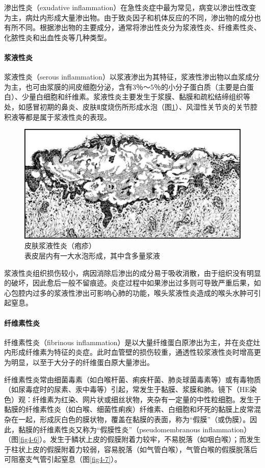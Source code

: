 渗出性炎（exudative
inflammation）在急性炎症中最为常见，病变以渗出性改变为主，病灶内形成大量渗出物。由于致炎因子和机体反应的不同，渗出物的成分也有所不同。根据渗出物的主要成分，通常将渗出性炎分为浆液性炎、纤维素性炎、化脓性炎和出血性炎等几种类型。

\paragraph{浆液性炎}
浆液性炎（serous
inflammation）以浆液渗出为其特征，浆液性渗出物以血浆成分为主，也可由浆膜的间皮细胞分泌，含有3％～5％的小分子蛋白质（主要是白蛋白）、少量白细胞和纤维素。浆液性炎主要发生于浆膜、黏膜和疏松结缔组织等处，如感冒初期的鼻炎、皮肤Ⅱ度烧伤所形成水泡（图\ref{fig4-5}）、风湿性关节炎的关节腔积液等都是属于浆液性炎的表现。

\begin{figure}[!htbp]
  \centering
  \includegraphics{./images/Image00056.jpg}
  \caption{皮肤浆液性炎（疱疹）\\ {\small 表皮层内有一大水泡形成，其中含多量浆液}}
  \label{fig4-5}
\end{figure}

浆液性炎组织损伤较小，病因消除后渗出的成分易于吸收消散，由于组织没有明显的破坏，因此愈后一般不留痕迹。炎症过程中如果渗出过多则可导致严重后果，如心包腔内过多的浆液性渗出可影响心肺的功能，喉头浆液性炎造成的喉头水肿可引起窒息。

\paragraph{纤维素性炎}
纤维素性炎（fibrinous
inflammation）是以大量纤维蛋白原渗出为主，并在炎症灶内形成纤维素为特征的炎症。此时血管壁的损伤较重，通透性较浆液性炎时增高更为明显，以至于大分子的纤维蛋白原大量渗出。

纤维素性炎常由细菌毒素（如白喉杆菌、痢疾杆菌、肺炎球菌毒素等）或有毒物质（如尿毒症时的尿素、汞中毒等）引起，常发生于黏膜、浆膜和肺。镜下（HE染色）观：纤维素为红染、网片状或细丝状物，夹杂有一定量的中性粒细胞。发生于黏膜的纤维素性炎（如白喉、细菌性痢疾）纤维素、白细胞和坏死的黏膜上皮常混杂在一起，形成灰白色的膜状物，覆盖在黏膜的表面，称为“假膜”（或伪膜）。因此，黏膜的纤维素性炎又称为“假膜性炎”（pseudomembranous
inflammation）（图\ref{fig4-6}）。发生于鳞状上皮的假膜附着力较牢，不易脱落（如咽白喉）；而发生于柱状上皮的假膜附着力较弱，容易脱落（如气管白喉），气管白喉的假膜脱落后可阻塞支气管引起窒息（图\ref{fig4-7}）。


